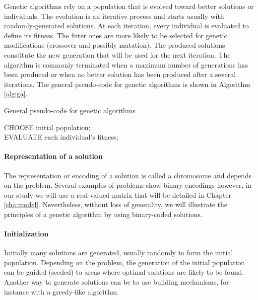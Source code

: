 Genetic algorithms rely on a population that is evolved toward better solutions or individuals. The evolution is an iterative process and starts usually with randomly-generated solutions. At each iteration, every individual is evaluated to define its fitness. The fitter ones are more likely to be selected for genetic modifications (crossover and possibly mutation). The produced solutions constitute the new generation that will be used for the next iteration. The algorithm is commonly terminated when a maximum number of generations has been produced or when no better solution has been produced after a several iterations. The general pseudo-code for genetic algorithms is shown in Algorithm \ref{alg:ga}.

\begin{algorithm}[h!]
\caption{General pseudo-code for genetic algorithms}
\label{alg:ga}
CHOOSE initial population;\\
EVALUATE each individual's fitness;\\
\end{algorithm}

\paragraph{Representation of a solution}
The representation or encoding of a solution is called a chromosome and depends on the problem. Several examples of problems show binary encodings however, in our study we will use a real-valued matrix that will be detailed in Chapter \ref{cha:model}. Nevertheless, without loss of generality, we will illustrate the principles of a genetic algorithm by using binary-coded solutions.

\paragraph{Initialization}
Initially many solutions are generated, usually randomly to form the initial population. Depending on the problem, the generation of the initial population can be guided (seeded) to areas where optimal solutions are likely to be found. Another way to generate solutions can be to use building mechanisms, for instance with a greedy-like algorithm.

